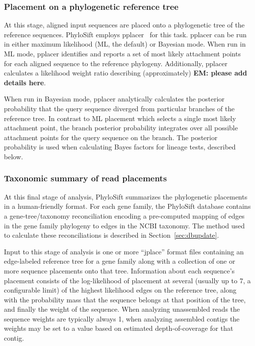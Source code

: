 \documentclass[10pt]{article}
\begin{document}
\subsubsection*{Placement on a phylogenetic reference tree}

At this stage, aligned input sequences are placed onto a phylogenetic tree of the reference sequences.
PhyloSift employs pplacer~\cite{Matsen2010} for this task.
pplacer can be run in either maximum likelihood (ML, the default) or Bayesian mode.
When run in ML mode, pplacer identifies and reports a set of most likely attachment points for each aligned sequence to the reference phylogeny.
Additionally, pplacer calculates a likelihood weight ratio describing (approximately) \textbf{EM: please add details here}.

When run in Bayesian mode, pplacer analytically calculates the posterior probability that the query sequence diverged from particular branches of the reference tree. 
In contrast to ML placement which selects a single most likely attachment point, the branch posterior probability integrates over all possible attachment points for the query sequence on the branch.
The posterior probability is used when calculating Bayes factors for lineage tests, described below.

\subsubsection*{Taxonomic summary of read placements}
At this final stage of analysis, PhyloSift summarizes the phylogenetic placements in a human-friendly format.
For each gene family, the PhyloSift database contains a gene-tree/taxonomy reconciliation encoding a pre-computed mapping of edges in the gene family phylogeny to edges in the NCBI taxonomy.
The method used to calculate these reconciliations is described in Section~\ref{sec:dbupdate}.

Input to this stage of analysis is one or more ``jplace'' format files containing an edge-labeled reference tree for a gene family along with a collection of one or more sequence placements onto that tree.
Information about each sequence's placement consists of the log-likelihood of placement at several (usually up to 7, a configurable limit) of the highest likelihood edges on the reference tree, along with the probability mass that the sequence belongs at that position of the tree, and finally the weight of the sequence. 
When analyzing unassembled reads the sequence weights are typically always 1, when analyzing assembled contigs the weights may be set to a value based on estimated depth-of-coverage for that contig.
\end{document}

